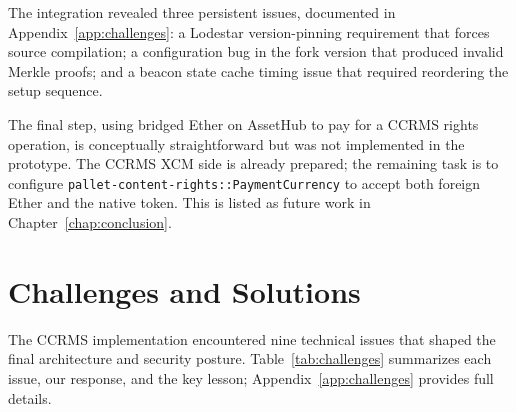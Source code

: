The integration revealed three persistent issues, documented in Appendix~\ref{app:challenges}: a Lodestar version-pinning requirement that forces source compilation; a configuration bug in the fork version that produced invalid Merkle proofs; and a beacon state cache timing issue that required reordering the setup sequence.

The final step, using bridged Ether on AssetHub to pay for a CCRMS rights operation, is conceptually straightforward but was not implemented in the prototype. The CCRMS XCM side is already prepared; the remaining task is to configure \texttt{pallet-content-rights::PaymentCurrency} to accept both foreign Ether and the native token. This is listed as future work in Chapter~\ref{chap:conclusion}.

\section{Challenges and Solutions}\label{sec:challenges-solutions}

The CCRMS implementation encountered nine technical issues that shaped the final architecture and security posture. Table~\ref{tab:challenges} summarizes each issue, our response, and the key lesson; Appendix~\ref{app:challenges} provides full details.

